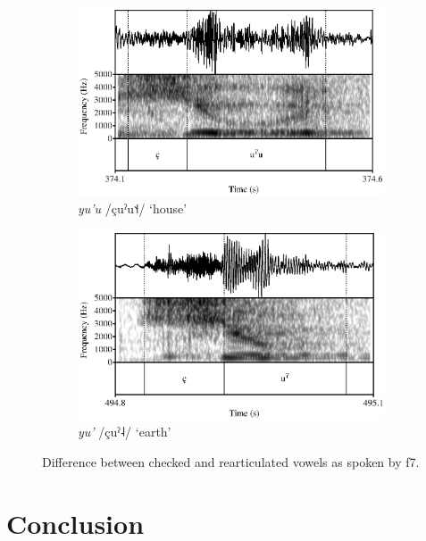 \begin{figure}[h!]
	\centering
	\begin{subfigure}{.5\textwidth}
		\centering
		\includegraphics[width=\linewidth]{images/f7_yu7u_context.eps}
		\caption{\textit{yu'u} /çuˀu˦˧/ `house'}
		\label{fig:f7rearticulated}
	\end{subfigure}%
	\begin{subfigure}{.5\textwidth}
		\centering
		\includegraphics[width=\linewidth]{images/f7_yu7.eps}
		\caption{\textit{yu'} /çuˀ˨/ `earth'}
		\label{fig:f7checked}
	\end{subfigure}
	\caption{Difference between checked and rearticulated vowels as spoken by f7.}
	\label{fig:f7creaky_rearticulated}
\end{figure}

\section{Conclusion}\label{sec:conclusion_of_lc}

